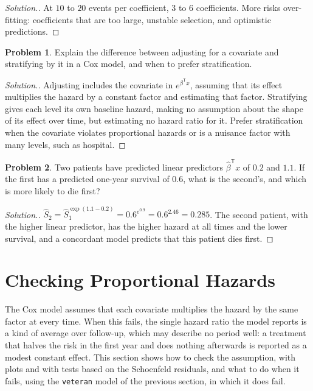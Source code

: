 \documentclass[11pt,a4paper]{article}
\numberwithin{equation}{section}
\theoremstyle{definition}
\newtheorem{problemx}{Problem}[subsection]
\newenvironment{problem}{\begin{problemx}}{\end{problemx}}
\newenvironment{solution}
  {\renewcommand{\qedsymbol}{}\begin{proof}[\textit{Solution}.]}
  {\end{proof}}
\begin{document}
\begin{solution}
At $10$ to $20$ events per coefficient, $3$ to $6$ coefficients. More risks over-fitting: coefficients that are too large, unstable selection, and optimistic predictions.
\end{solution}

\begin{problem}
Explain the difference between adjusting for a covariate and stratifying by it in a Cox model, and when to prefer stratification.
\end{problem}

\begin{solution}
Adjusting includes the covariate in $e^{\beta^{\mathsf T}x}$, assuming that its effect multiplies the hazard by a constant factor and estimating that factor. Stratifying gives each level its own baseline hazard, making no assumption about the shape of its effect over time, but estimating no hazard ratio for it. Prefer stratification when the covariate violates proportional
hazards or is a nuisance factor with many levels, such as hospital.
\end{solution}

\begin{problem}
Two patients have predicted linear predictors $\hat\beta^{\mathsf T}x$ of $0.2$ and $1.1$. If the first has a predicted one-year survival of $0.6$, what is the second's, and which is more likely to die first?
\end{problem}

\begin{solution}
$\hat S_2 = \hat S_1^{\exp(1.1 - 0.2)} = 0.6^{e^{0.9}} = 0.6^{2.46} = 0.285$. The second patient, with the higher linear predictor, has the higher hazard at all times and the lower survival, and a concordant model predicts that this patient dies first.
\end{solution}

\section{Checking Proportional Hazards}
\label{sec:ph}

The Cox model assumes that each covariate multiplies the hazard by the same factor at every time. When this fails, the single hazard ratio the model reports is a kind of average over follow-up, which may describe no period well: a treatment that halves the risk in the first year and does nothing afterwards is reported as a modest constant effect. This section
shows how to check the assumption, with plots and with tests based on the Schoenfeld residuals, and what to do when it fails, using the \texttt{veteran} model of the previous section, in which it does fail.
\end{document}
